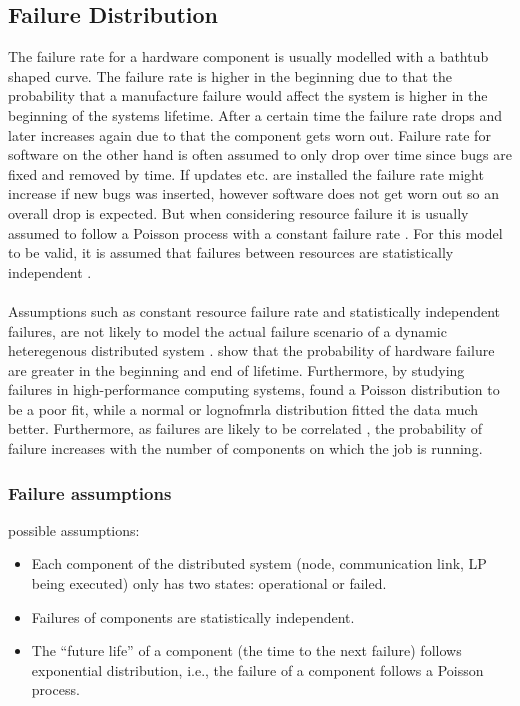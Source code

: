 \documentclass{cslthse-msc}
\begin{document}
\subsection{Failure Distribution}
The failure rate for a hardware component is usually modelled with a bathtub shaped curve. The failure rate is higher in the beginning due to that the probability that a manufacture failure would affect the system is higher in the beginning of the systems lifetime. After a certain time the failure rate drops and later increases again due to that the component gets worn out.
Failure rate for software on the other hand is often assumed to only drop over time since bugs are fixed and removed by time. If updates etc. are installed the failure rate might increase if new bugs was inserted, however software does not get worn out so an overall drop is expected.
But when considering resource failure it is usually assumed to follow a Poisson process with a constant failure rate \cite{algoMaxRelEndToEndConstraint} \cite{algoMinExTime} \cite{relModelDistSimSystem} \cite{optTaskAllocationForMaxRel} \cite{perfImplPerCheckPoint} \cite{optCheckpointInterval}. For this model to be valid, it is assumed that failures between resources are statistically independent \cite{algoMaxRelEndToEndConstraint}. 
\\\\
Assumptions such as constant resource failure rate and statistically independent failures, are not likely to model the actual failure scenario of a dynamic heteregenous distributed system \cite{algoMinExTime}. 
\cite{surveyReliabilityDistr} show that the probability of hardware failure are greater in the beginning and end of lifetime. Furthermore, by studying failures in high-performance computing systems, \cite{studyOfFailures} found a Poisson distribution to be a poor fit, while a normal or lognofmrla distribution fitted the data much better. Furthermore, as failures are likely to be correlated \cite{perfImplPerCheckPoint}, the probability of failure increases with the number of components on which the job is running.

 
\subsubsection{Failure assumptions}
possible assumptions:
\begin{itemize}
\item  Each component of the distributed system (node, communication link, LP being executed) only has two states: operational or failed.
\item Failures of components are statistically independent.
\item The “future life” of a component (the time to the next failure) follows exponential distribution, i.e., the failure of a component follows a Poisson process.
\end{itemize}
\end{document}
